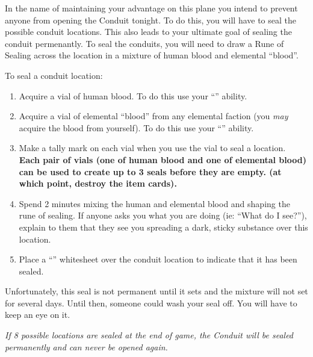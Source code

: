 \documentclass[green]{elementals}
\begin{document}
\name{\gSealingLocations{}}

In the name of maintaining your advantage on this plane you intend to prevent anyone from opening the Conduit tonight.  To do this, you will have to seal the possible conduit locations. This also leads to your ultimate goal of sealing the conduit permenantly. To seal the conduits, you will need to draw a Rune of Sealing across the location in a mixture of human blood and elemental ``blood''.

To seal a conduit location:
\begin{enumerate}
  \item Acquire a vial of human blood. To do this use your ``\aDrawBlood{}'' ability.
  \item Acquire a vial of elemental ``blood'' from any elemental faction (you \emph{may} acquire the blood from yourself). To do this use your ``\aDrawBlood{}'' ability.
  \item Make a tally mark on each vial when you use the vial to seal a location. {\bf Each pair of vials (one of human blood and one of elemental blood) can be used to create up to 3 seals before they are empty. (at which point, destroy the item cards).}
  \item Spend 2 minutes mixing the human and elemental blood and shaping the rune of sealing. If anyone asks you what you are doing (ie: ``What do I see?''), explain to them that they see you spreading a dark, sticky substance over this location.
  \item Place a ``\wSealedConduit{}'' whitesheet over the conduit location to indicate that it has been sealed.
\end{enumerate}

Unfortunately, this seal is not permanent until it sets and the mixture will not set for several days. Until then, someone could wash your seal off. You will have to keep an eye on it.

{\large \emph{If 8 possible locations are sealed at the end of game, the Conduit will be sealed permanently and can never be opened again.}}
\end{document}
